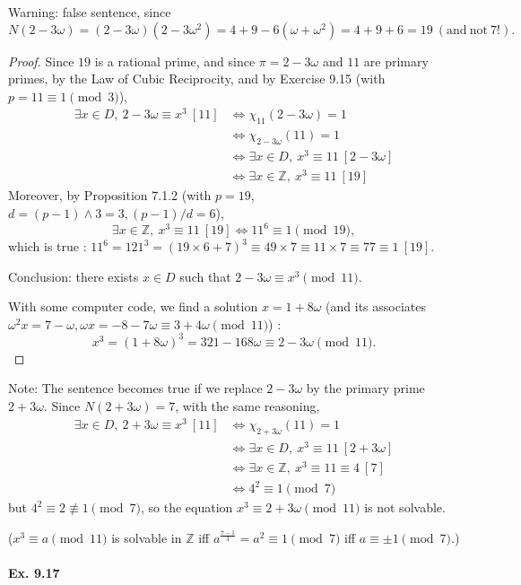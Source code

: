 \documentclass[11pt,a4paper]{article}
\newcommand{\Z}{\mathbb{Z}}
\begin{document}
\bigskip
Warning: false sentence, since 
$$N(2 - 3 \omega) = (2-3\omega)(2 - 3 \omega^2) = 4 + 9 -6(\omega+\omega^2) = 4 + 9 + 6 = 19 \ (\mathrm{and}\ \mathrm{not}\ 7!).$$
\begin{proof}
Since $19$ is a rational prime, and since $\pi= 2 - 3\omega$ and $11$  are primary primes, by the Law of Cubic Reciprocity, and by Exercise 9.15 (with $p=11 \equiv 1 \pmod 3$),
\begin{align*}
\exists x \in D,\ 2-3\omega \equiv x^3\ [11]&\iff \chi_{11}(2-3\omega) = 1\\
&\iff \chi_{2-3\omega}(11)=1\\
&\iff \exists x \in D,\  x^3 \equiv 11\  [2 - 3 \omega]\\
&\iff \exists x \in \mathbb{Z},\  x^3 \equiv 11\  [19]
\end{align*}
Moreover, by Proposition 7.1.2 (with $p = 19$, $d = (p-1) \wedge 3 = 3, (p-1)/d = 6$),
$$\exists x \in \mathbb{Z},\  x^3 \equiv 11\  [19] \iff 11^6 \equiv 1 \pmod {19},$$
which is true : $11^6 = 121^3 = (19 \times 6 + 7)^3 \equiv 49 \times 7 \equiv 11 \times 7 \equiv 77 \equiv 1 \ [19]$.

Conclusion: there exists $x \in D$ such that $2-3\omega  \equiv x^3 \pmod {11}$.

With some computer code, we find a solution $x = 1 + 8\omega$ (and its associates $\omega^2 x =  7 - \omega, \omega x = -8- 7\omega \equiv 3 + 4 \omega \pmod{11} $) :
$$x^3 = (1+8\omega)^3 = 321 - 168 \omega \equiv 2 - 3 \omega \pmod {11}.$$
\end{proof}

Note: The sentence becomes true if we replace $2 - 3\omega$ by the primary prime $2+3\omega$. Since $N(2+3\omega) = 7$, with the same reasoning,
\begin{align*}
\exists x \in D,\ 2+3\omega \equiv x^3\ [11]
&\iff \chi_{2+3\omega}(11)=1\\
&\iff \exists x \in D,\  x^3 \equiv 11\  [2 + 3 \omega]\\
&\iff \exists x \in \mathbb{Z},\  x^3 \equiv 11 \equiv 4\  [7]\\
&\iff 4^2 \equiv 1 \pmod 7
\end{align*}
but $4^2 \equiv 2 \not \equiv 1 \pmod 7$, so the equation $x^3 \equiv 2 + 3\omega \pmod {11}$ is not solvable.

($x^3 \equiv a \pmod {11}$ is solvable in $\Z$ iff $a^\frac{7-1}{3} = a^2 \equiv 1 \pmod 7$ iff $a \equiv \pm 1 \pmod 7$.)



\paragraph{Ex. 9.17}
\end{document}
